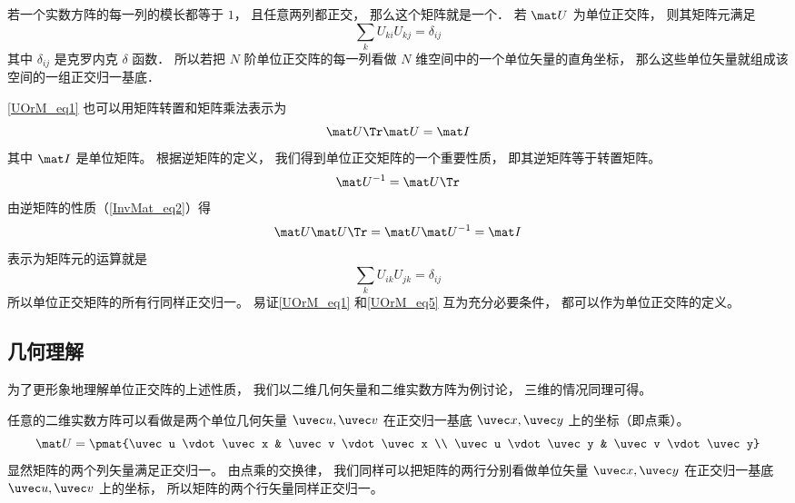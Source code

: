 

若一个实数方阵的每一列的模长都等于 $1$， 且任意两列都正交， 那么这个矩阵就是一个． 若 $\mat U$ 为单位正交阵， 则其矩阵元满足
\begin{equation}\label{UOrM_eq1}
\sum_k U_{ki} U_{kj} = \delta_{ij}
\end{equation}
其中 $\delta_{ij}$ 是克罗内克 $\delta$ 函数． 所以若把 $N$ 阶单位正交阵的每一列看做 $N$ 维空间中的一个单位矢量的直角坐标， 那么这些单位矢量就组成该空间的一组正交归一基底．

\autoref{UOrM_eq1} 也可以用矩阵转置和矩阵乘法表示为
\begin{equation}
\mat U\Tr \mat U = \mat I
\end{equation}
其中 $\mat I$ 是单位矩阵。 根据逆矩阵的定义， 我们得到单位正交矩阵的一个重要性质， 即其逆矩阵等于转置矩阵。
\begin{equation}
\mat U^{-1} = \mat U\Tr
\end{equation}
由逆矩阵的性质（\autoref{InvMat_eq2}）得
\begin{equation}
\mat U \mat U\Tr = \mat U \mat U^{-1} = \mat I
\end{equation}
表示为矩阵元的运算就是
\begin{equation}\label{UOrM_eq5}
\sum_k U_{ik} U_{jk} = \delta_{ij}
\end{equation}
所以单位正交矩阵的所有行同样正交归一。 易证\autoref{UOrM_eq1} 和\autoref{UOrM_eq5} 互为充分必要条件， 都可以作为单位正交阵的定义。

\subsection{几何理解}
为了更形象地理解单位正交阵的上述性质， 我们以二维几何矢量和二维实数方阵为例讨论， 三维的情况同理可得。

任意的二维实数方阵可以看做是两个单位几何矢量 $\uvec u, \uvec v$ 在正交归一基底 $\uvec x, \uvec y$ 上的坐标（即点乘）。
\begin{equation}
\mat U = \pmat{\uvec u \vdot \uvec x & \uvec v \vdot \uvec x \\
\uvec u \vdot \uvec y & \uvec v \vdot \uvec y}
\end{equation}
显然矩阵的两个列矢量满足正交归一。 由点乘的交换律， 我们同样可以把矩阵的两行分别看做单位矢量 $\uvec x, \uvec y$ 在正交归一基底 $\uvec u, \uvec v$ 上的坐标， 所以矩阵的两个行矢量同样正交归一。

